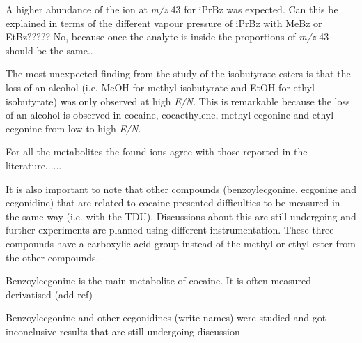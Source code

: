 A higher abundance of the ion at \textit{m/z} 43 for iPrBz was expected. Can this be explained in terms of the different vapour pressure of iPrBz with MeBz or EtBz????? No, because once the analyte is inside the proportions of \textit{m/z} 43 should be the same..


The most unexpected finding from the study of the isobutyrate esters is that the loss of an alcohol (i.e. MeOH for methyl isobutyrate and EtOH for ethyl isobutyrate) was only observed at high \textit{E/N}.
%
This is remarkable because the loss of an alcohol is observed in cocaine, cocaethylene, methyl ecgonine and ethyl ecgonine from low to high \textit{E/N}. 



For all the metabolites the found ions agree with those reported in the literature......





It is also important to note that other compounds (benzoylecgonine, ecgonine and ecgonidine) that are related to cocaine presented difficulties to be measured in the same way (i.e. with the TDU). Discussions about this are still undergoing and further experiments are planned using different instrumentation.
These three compounds have a carboxylic acid group instead of the methyl or ethyl ester from the other compounds.

Benzoylecgonine is the main metabolite of cocaine. It is often measured derivatised (add ref)





Benzoylecgonine and other ecgonidines (write names) were studied and got inconclusive results that are still undergoing discussion















 
 
 

 
 
 
 
 
 

